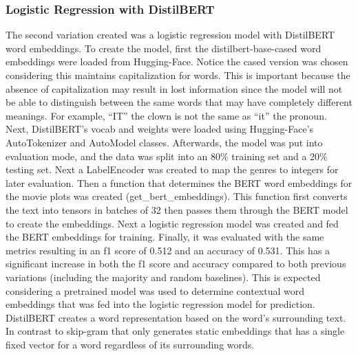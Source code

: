 \subsubsection{Logistic Regression with DistilBERT}
The second variation created was a logistic regression model with DistilBERT word embeddings. 
To create the model, first the distilbert-base-cased word embeddings were loaded from Hugging-Face. 
Notice the cased version was chosen considering this maintains capitalization for words. 
This is important because the absence of capitalization may result in lost information since the model will not be able to distinguish between the same words that may have completely different meanings. 
For example, “IT” the clown is not the same as “it” the pronoun. 
Next, DistilBERT’s vocab and weights were loaded using Hugging-Face’s AutoTokenizer and AutoModel classes. 
Afterwards, the model was put into evaluation mode, and the data was split into an 80\% training set and a 20\% testing set. 
Next a LabelEncoder was created to map the genres to integers for later evaluation. 
Then a function that determines the BERT word embeddings for the movie plots was created (get\_bert\_embeddings). 
This function first converts the text into tensors in batches of 32 then passes them through the BERT model to create the embeddings. 
Next a logistic regression model was created and fed the BERT embeddings for training. 
Finally, it was evaluated with the same metrics resulting in an f1 score of 0.512 and an accuracy of 0.531. 
This has a significant increase in both the f1 score and accuracy compared to both previous variations (including the majority and random baselines). 
This is expected considering a pretrained model was used to determine contextual word embeddings that was fed into the logistic regression model for prediction. 
DistilBERT creates a word representation based on the word’s surrounding text. 
In contrast to skip-gram that only generates static embeddings that has a single fixed vector for a word regardless of its surrounding words.